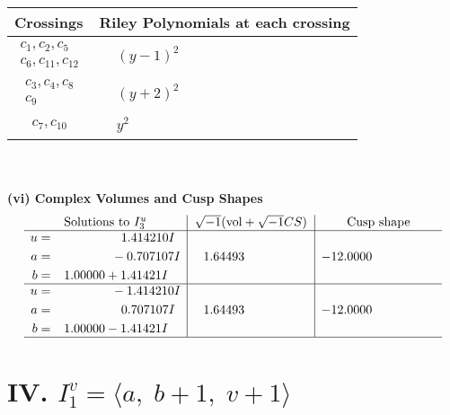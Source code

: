 \documentclass[1p]{elsarticle_modified}
\theoremstyle{definition}
\newcommand{\I}{\sqrt{-1}}
\begin{document}
\begin{tabular}{m{50pt}|m{274pt}}
Crossings & \hspace{64pt}Riley Polynomials at each crossing \\
\hline $$\begin{aligned}c_{1},c_{2},c_{5}\\c_{6},c_{11},c_{12}\end{aligned}$$&$\begin{aligned}
&(y-1)^2
\end{aligned}$\\
\hline $$\begin{aligned}c_{3},c_{4},c_{8}\\c_{9}\end{aligned}$$&$\begin{aligned}
&(y+2)^2
\end{aligned}$\\
\hline $$\begin{aligned}c_{7},c_{10}\end{aligned}$$&$\begin{aligned}
&y^2
\end{aligned}$\\
\hline
\end{tabular}\\~\\
\newpage\flushleft \textbf{(vi) Complex Volumes and Cusp Shapes}
$$\begin{array}{c|c|c}  
\text{Solutions to }I^u_{3}& \I (\text{vol} + \sqrt{-1}CS) & \text{Cusp shape}\\
 \hline 
\begin{aligned}
u &= \phantom{-0.000000 -}1.414210 I \\
a &= \phantom{-0.000000 } -0.707107 I \\
b &= \phantom{-}1.00000 + 1.41421 I\end{aligned}
 & \phantom{-}1.64493\phantom{ +0.000000I} & -12.0000\phantom{ +0.000000I} \\ \hline\begin{aligned}
u &= \phantom{-0.000000 } -1.414210 I \\
a &= \phantom{-0.000000 -}0.707107 I \\
b &= \phantom{-}1.00000 - 1.41421 I\end{aligned}
 & \phantom{-}1.64493\phantom{ +0.000000I} & -12.0000\phantom{ +0.000000I}\\
 \hline 
 \end{array}$$\newpage\newpage\renewcommand{\arraystretch}{1}
\centering \section*{IV. $I^v_{1}= \langle a,\;b+1,\;v+1 \rangle$}
\end{document}
